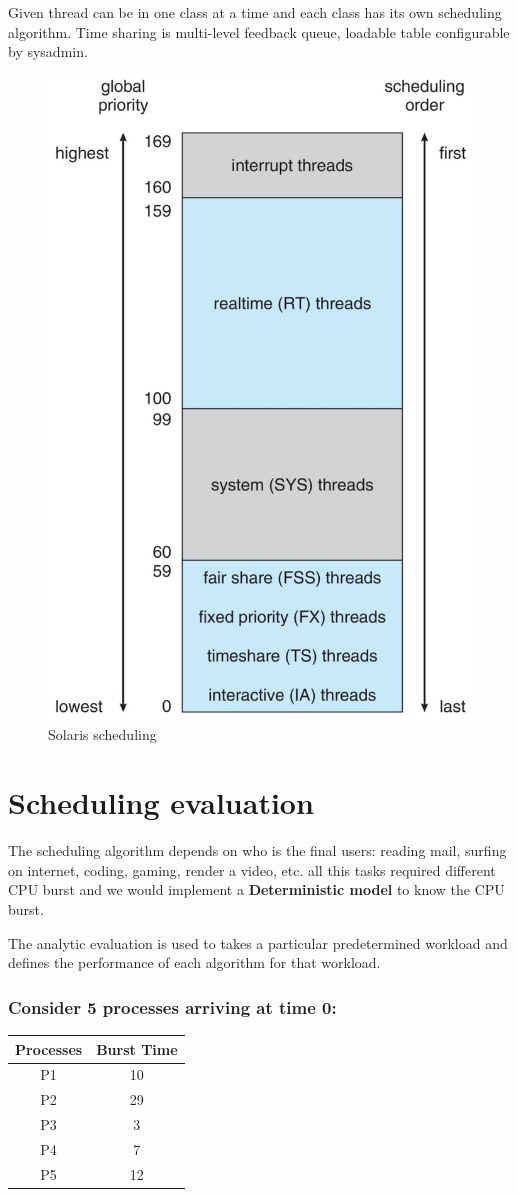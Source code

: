 Given thread can be in one class at a time and  each class has its own scheduling algorithm. Time sharing is multi-level feedback queue, loadable table configurable by sysadmin.

\begin{figure}[htbp]
    \centering
    \includegraphics[width=0.4\linewidth]{img/ssolaris.png}
    \caption{Solaris scheduling}
    
\end{figure}

\newpage
\section{Scheduling evaluation}

The scheduling algorithm depends on who is the final users: reading mail, surfing on internet, coding, gaming, render a video, etc. all this tasks required different CPU burst and  we would implement a  \textbf{Deterministic model} to know the CPU burst.

The analytic evaluation is used to takes a particular predetermined workload and defines the performance of each algorithm for that workload.

\subsubsection{Consider 5 processes arriving at time 0:}


\begin{table}[htbp]
    \centering
    \begin{tabular}{cc}
        Processes & Burst Time\\
        \hline
        P1 & 10 \\
        P2 & 29\\
        P3 & 3\\
        P4 & 7\\
        P5 & 12\\
    \end{tabular}
\end{table}


